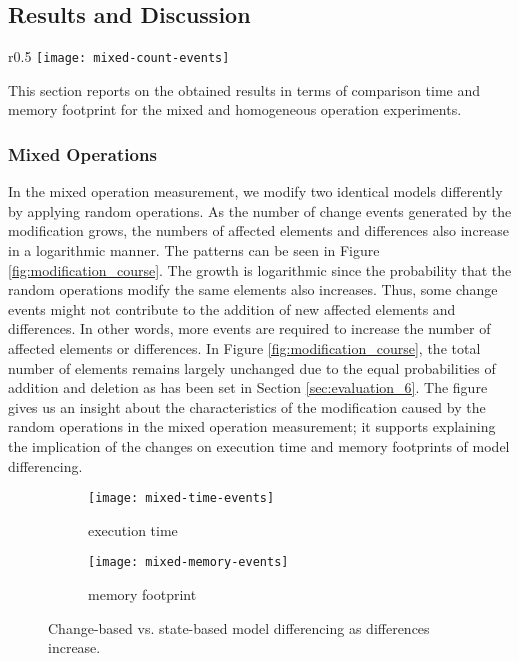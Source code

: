 \subsection{Results and Discussion}
\label{sec:results_and_discussion}

\begin{wrapfigure}[9]{r}{0.5\textwidth}
  \vspace{-20pt}
  \texttt{[image: mixed-count-events]}
  \caption{total elements, affected elements, and diffs}
  \label{fig:modification_course}
\end{wrapfigure}

This section reports on the obtained results in terms of comparison time and memory footprint for the mixed and homogeneous operation experiments. 


\vspace{-5pt}
\subsubsection{Mixed Operations}
\label{sec:mixed-operation}
In the mixed operation measurement, we modify two identical models differently by applying random operations. As the number of change events generated by the modification grows, the numbers of affected elements and differences also increase in a logarithmic manner. The patterns can be seen in Figure \ref{fig:modification_course}. The growth is logarithmic since the probability that the random operations modify the same elements also increases. Thus, some change events might not contribute to the addition of new affected elements and differences. In other words, more events are required to increase the number of affected elements or differences. In Figure \ref{fig:modification_course}, the total number of elements remains largely unchanged due to the equal probabilities of addition and deletion as has been set in Section \ref{sec:evaluation_6}. The figure gives us an insight about the characteristics of the modification caused by the random operations in the mixed operation measurement; it supports explaining the implication of the changes on execution time and memory footprints of model differencing.

\begin{figure}[ht]
  \begin{subfigure}[t]{0.495\linewidth}
    \texttt{[image: mixed-time-events]}
    \caption{execution time}
    \label{fig:time_diffs}
  \end{subfigure}
  \begin{subfigure}[t]{0.495\linewidth}
    \texttt{[image: mixed-memory-events]}
    \caption{memory footprint}
    \label{fig:memory_diffs}
  \end{subfigure}
  \caption{Change-based vs. state-based model differencing as differences increase.}
  \label{fig:change_vs_state}
\end{figure}


